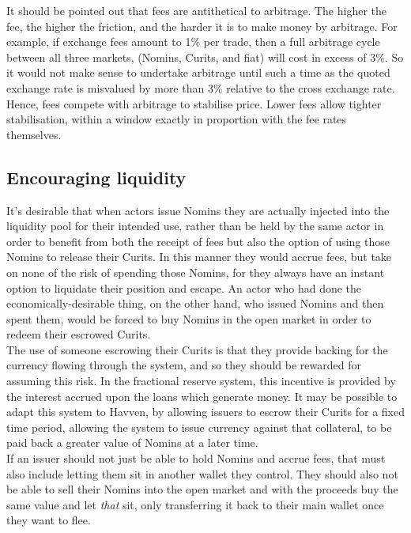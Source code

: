 It should be pointed out that fees are antithetical to arbitrage. The higher the fee, the higher the friction, and the harder it is to make money by arbitrage. For example, if exchange fees amount to 1\% per trade, then a full arbitrage cycle between all three markets, (Nomins, Curits, and fiat) will cost in excess of 3\%. So it would not make sense to undertake arbitrage until such a time as the quoted exchange rate is misvalued by more than 3\% relative to the cross exchange rate. Hence, fees compete with arbitrage to stabilise price. Lower fees allow tighter stabilisation, within a window exactly in proportion with the fee rates themselves.


\pagebreak
\subsection{Encouraging liquidity}

\noindent It's desirable that when actors issue Nomins they are actually injected into the liquidity pool for their intended use, rather than be held by the same actor in order to benefit from both the receipt of fees but also the option of using those Nomins to release their Curits. In this manner they would accrue fees, but take on none of the risk of spending those Nomins, for they always have an instant option to liquidate their position and escape. An actor who had done the economically-desirable thing, on the other hand, who issued Nomins and then spent them, would be forced to buy Nomins in the open market in order to redeem their escrowed Curits. \\

\noindent The use of someone escrowing their Curits is that they provide backing for the currency flowing through the system, and so they should be rewarded for assuming this risk. In the fractional reserve system, this incentive is provided by the interest accrued upon the loans which generate money. It may be possible to adapt this system to Havven, by allowing issuers to escrow their Curits for a fixed time period, allowing the system to issue currency against that collateral, to be paid back a greater value of Nomins at a later time. \\

\noindent If an issuer should not just be able to hold Nomins and accrue fees, that must also include letting them sit in another wallet they control. They should also not be able to sell their Nomins into the open market and with the proceeds buy the same value and let \textit{that} sit, only transferring it back to their main wallet once they want to flee.

